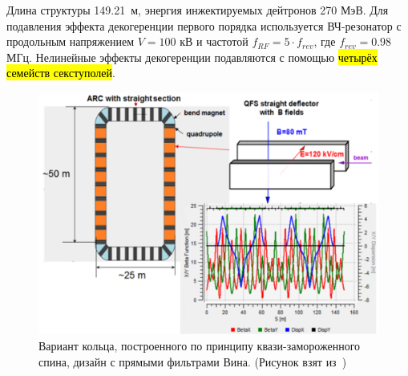 Длина структуры 149.21~м, энергия инжектируемых дейтронов 270 МэВ. Для подавления эффекта декогеренции первого порядка используется ВЧ-резонатор с продольным напряжением $V = 100$ кВ и частотой $f_{RF} = 5\cdot f_{rev}$, где $f_{rev} = 0.98$ МГц. Нелинейные эффекты декогеренции подавляются с помощью \hl{четырёх семейств секступолей}.
\begin{figure}[h!]
	\centering
	\includegraphics[width=\linewidth]{images/chapter2/E+B_lattice}
	\caption{Вариант кольца, построенного по принципу квази-замороженного спина, дизайн с прямыми фильтрами Вина. (Рисунок взят из~\cite{Senichev:Lattices})\label{fig:QFS_E+B_lattice}}
\end{figure}

